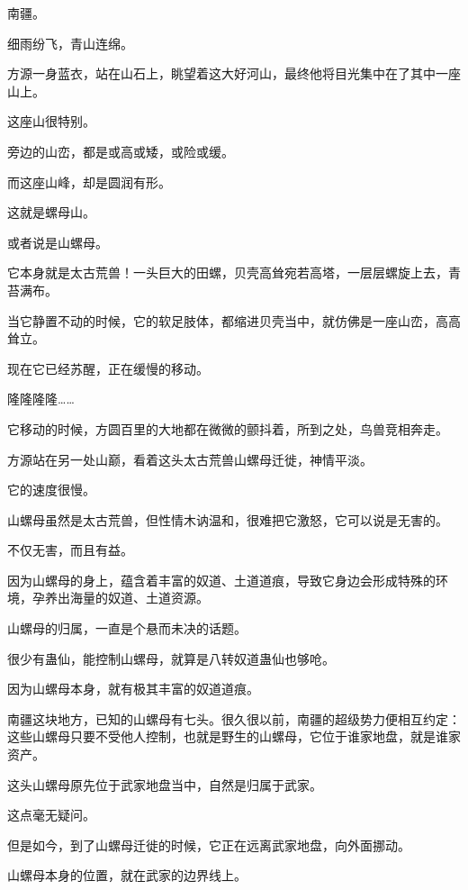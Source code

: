 
\begin{this_body}



南疆。

细雨纷飞，青山连绵。

方源一身蓝衣，站在山石上，眺望着这大好河山，最终他将目光集中在了其中一座山上。

这座山很特别。

旁边的山峦，都是或高或矮，或险或缓。

而这座山峰，却是圆润有形。

这就是螺母山。

或者说是山螺母。

它本身就是太古荒兽！一头巨大的田螺，贝壳高耸宛若高塔，一层层螺旋上去，青苔满布。

当它静置不动的时候，它的软足肢体，都缩进贝壳当中，就仿佛是一座山峦，高高耸立。

现在它已经苏醒，正在缓慢的移动。

隆隆隆隆……

它移动的时候，方圆百里的大地都在微微的颤抖着，所到之处，鸟兽竞相奔走。

方源站在另一处山巅，看着这头太古荒兽山螺母迁徙，神情平淡。

它的速度很慢。

山螺母虽然是太古荒兽，但性情木讷温和，很难把它激怒，它可以说是无害的。

不仅无害，而且有益。

因为山螺母的身上，蕴含着丰富的奴道、土道道痕，导致它身边会形成特殊的环境，孕养出海量的奴道、土道资源。

山螺母的归属，一直是个悬而未决的话题。

很少有蛊仙，能控制山螺母，就算是八转奴道蛊仙也够呛。

因为山螺母本身，就有极其丰富的奴道道痕。

南疆这块地方，已知的山螺母有七头。很久很以前，南疆的超级势力便相互约定：这些山螺母只要不受他人控制，也就是野生的山螺母，它位于谁家地盘，就是谁家资产。

这头山螺母原先位于武家地盘当中，自然是归属于武家。

这点毫无疑问。

但是如今，到了山螺母迁徙的时候，它正在远离武家地盘，向外面挪动。

山螺母本身的位置，就在武家的边界线上。


\end{this_body}
